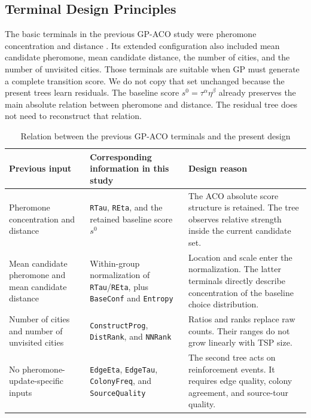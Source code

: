 \documentclass[letterpaper,journal]{IEEEtran}
\begin{document}
\subsection{Terminal Design Principles}

The basic terminals in the previous GP-ACO study were pheromone concentration
and distance \cite{lin2025gpaco}.
Its extended configuration also included mean candidate pheromone, mean
candidate distance, the number of cities, and the number of unvisited cities.
Those terminals are suitable when GP must generate a complete transition score.
We do not copy that set unchanged because the present trees learn residuals.
The baseline score \(s^0=\tau^\alpha\eta^\beta\) already preserves the main
absolute relation between pheromone and distance.
The residual tree does not need to reconstruct that relation.

\begin{table}[t]
\caption{Relation between the previous GP-ACO terminals and the present design}
\label{tab:terminal-comparison}
\centering
\footnotesize
\renewcommand{\arraystretch}{1.15}
\setlength{\tabcolsep}{3pt}
\begin{tabular}{L{39mm}L{59mm}L{70mm}}
\toprule
Previous input & Corresponding information in this study & Design reason\\
\midrule
Pheromone concentration and distance &
\texttt{RTau}, \texttt{REta}, and the retained baseline score \(s^0\) &
The ACO absolute score structure is retained.
The tree observes relative strength inside the current candidate set.\\
Mean candidate pheromone and mean candidate distance &
Within-group normalization of \texttt{RTau}/\texttt{REta}, plus
\texttt{BaseConf} and \texttt{Entropy} &
Location and scale enter the normalization.
The latter terminals directly describe concentration of the baseline choice
distribution.\\
Number of cities and number of unvisited cities &
\texttt{ConstructProg}, \texttt{DistRank}, and \texttt{NNRank} &
Ratios and ranks replace raw counts.
Their ranges do not grow linearly with TSP size.\\
No pheromone-update-specific inputs &
\texttt{EdgeEta}, \texttt{EdgeTau}, \texttt{ColonyFreq}, and
\texttt{SourceQuality} &
The second tree acts on reinforcement events.
It requires edge quality, colony agreement, and source-tour quality.\\
\bottomrule
\end{tabular}
\end{table}
\end{document}
